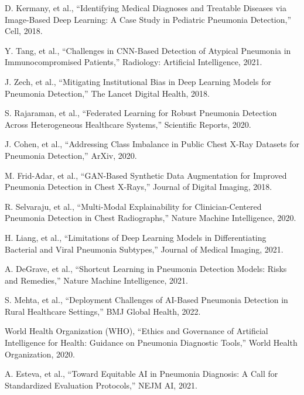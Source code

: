\documentclass[
  twocolumn,
  10pt,
  a4paper,
  journal
]{IEEEtran}
\begin{document}
\begin{thebibliography}{25}
 D. Kermany, et al., ``Identifying Medical Diagnoses and Treatable Diseases via Image-Based Deep Learning: A Case Study in Pediatric Pneumonia Detection,'' Cell, 2018.

 Y. Tang, et al., ``Challenges in CNN-Based Detection of Atypical Pneumonia in Immunocompromised Patients,'' Radiology: Artificial Intelligence, 2021.

 J. Zech, et al., ``Mitigating Institutional Bias in Deep Learning Models for Pneumonia Detection,'' The Lancet Digital Health, 2018.

 S. Rajaraman, et al., ``Federated Learning for Robust Pneumonia Detection Across Heterogeneous Healthcare Systems,'' Scientific Reports, 2020.

 J. Cohen, et al., ``Addressing Class Imbalance in Public Chest X-Ray Datasets for Pneumonia Detection,'' ArXiv, 2020.

 M. Frid-Adar, et al., ``GAN-Based Synthetic Data Augmentation for Improved Pneumonia Detection in Chest X-Rays,'' Journal of Digital Imaging, 2018.

 R. Selvaraju, et al., ``Multi-Modal Explainability for Clinician-Centered Pneumonia Detection in Chest Radiographs,'' Nature Machine Intelligence, 2020.

 H. Liang, et al., ``Limitations of Deep Learning Models in Differentiating Bacterial and Viral Pneumonia Subtypes,'' Journal of Medical Imaging, 2021.

 A. DeGrave, et al., ``Shortcut Learning in Pneumonia Detection Models: Risks and Remedies,'' Nature Machine Intelligence, 2021.

 S. Mehta, et al., ``Deployment Challenges of AI-Based Pneumonia Detection in Rural Healthcare Settings,'' BMJ Global Health, 2022.

 World Health Organization (WHO), ``Ethics and Governance of Artificial Intelligence for Health: Guidance on Pneumonia Diagnostic Tools,'' World Health Organization, 2020.

 A. Esteva, et al., ``Toward Equitable AI in Pneumonia Diagnosis: A Call for Standardized Evaluation Protocols,'' NEJM AI, 2021.

\end{thebibliography}
\end{document}
